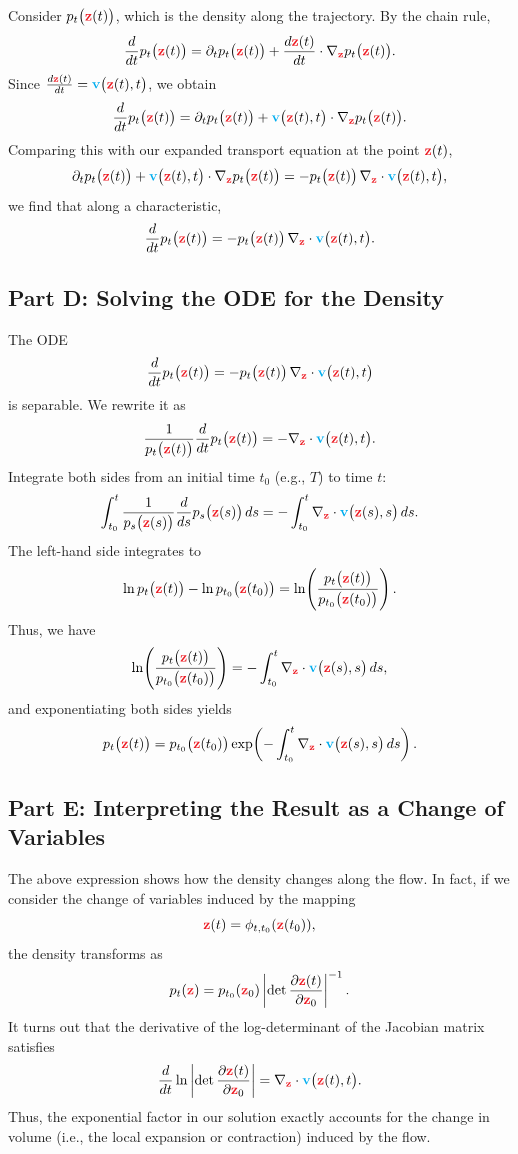 \documentclass[usenames,dvipsnames]{article}
\newcommand{\myvec}[1]{\mathbf{#1}}
\newcommand{\vz}{\myvec{\textcolor{Red}{z}}}
\newcommand{\vv}{\myvec{\textcolor{Cyan}{v}}}
\begin{document}
Consider $p_t\bigl(\vz(t)\bigr)$,
which is the density along the trajectory. By the chain rule,
\[
\frac{d}{dt} p_t\bigl(\vz(t)\bigr) = \partial_t p_t\bigl(\vz(t)\bigr) + \frac{d\vz(t)}{dt} \cdot \nabla_{\vz} p_t\bigl(\vz(t)\bigr).
\]
Since \(\frac{d\vz(t)}{dt} = \vv\bigl(\vz(t),t\bigr)\), we obtain
\[
\frac{d}{dt} p_t\bigl(\vz(t)\bigr) = \partial_t p_t\bigl(\vz(t)\bigr) + \vv\bigl(\vz(t),t\bigr) \cdot \nabla_{\vz} p_t\bigl(\vz(t)\bigr).
\]
Comparing this with our expanded transport equation at the point \(\vz(t)\),
\[
\partial_t p_t\bigl(\vz(t)\bigr) + \vv\bigl(\vz(t),t\bigr) \cdot \nabla_{\vz} p_t\bigl(\vz(t)\bigr) = - p_t\bigl(\vz(t)\bigr) \, \nabla_{\vz} \cdot \vv\bigl(\vz(t),t\bigr),
\]
we find that along a characteristic,
\[
\frac{d}{dt} p_t\bigl(\vz(t)\bigr) = - p_t\bigl(\vz(t)\bigr) \, \nabla_{\vz} \cdot \vv\bigl(\vz(t),t\bigr).
\]

\subsection*{Part D: Solving the ODE for the Density}

The ODE
\[
\frac{d}{dt} p_t\bigl(\vz(t)\bigr) = - p_t\bigl(\vz(t)\bigr) \, \nabla_{\vz} \cdot \vv\bigl(\vz(t),t\bigr)
\]
is separable. We rewrite it as
\[
\frac{1}{p_t\bigl(\vz(t)\bigr)} \frac{d}{dt} p_t\bigl(\vz(t)\bigr) = - \nabla_{\vz} \cdot \vv\bigl(\vz(t),t\bigr).
\]
Integrate both sides from an initial time \(t_0\) (e.g., \(T\)) to time \(t\):
\[
\int_{t_0}^{t} \frac{1}{p_s\bigl(\vz(s)\bigr)} \frac{d}{ds} p_s\bigl(\vz(s)\bigr) \, ds
= - \int_{t_0}^{t} \nabla_{\vz} \cdot \vv\bigl(\vz(s),s\bigr) \, ds.
\]
The left-hand side integrates to
\[
\ln p_t\bigl(\vz(t)\bigr) - \ln p_{t_0}\bigl(\vz(t_0)\bigr) = \ln\!\left( \frac{p_t\bigl(\vz(t)\bigr)}{p_{t_0}\bigl(\vz(t_0)\bigr)} \right).
\]
Thus, we have
\[
\ln\!\left( \frac{p_t\bigl(\vz(t)\bigr)}{p_{t_0}\bigl(\vz(t_0)\bigr)} \right)
= - \int_{t_0}^{t} \nabla_{\vz} \cdot \vv\bigl(\vz(s),s\bigr) \, ds,
\]
and exponentiating both sides yields
\[
p_t\bigl(\vz(t)\bigr) = p_{t_0}\bigl(\vz(t_0)\bigr) \exp\!\left(- \int_{t_0}^{t} \nabla_{\vz} \cdot \vv\bigl(\vz(s),s\bigr) \, ds\right).
\]

\subsection*{Part E: Interpreting the Result as a Change of Variables}

The above expression shows how the density changes along the flow. In fact, if we consider the change of variables induced by the mapping
\[
\vz(t) = \phi_{t,t_0}(\vz(t_0)),
\]
the density transforms as
\[
p_t(\vz) = p_{t_0}(\vz_0) \left|\det \frac{\partial \vz(t)}{\partial \vz_0}\right|^{-1}.
\]
It turns out that the derivative of the log-determinant of the Jacobian matrix satisfies
\[
\frac{d}{dt} \ln \left|\det \frac{\partial \vz(t)}{\partial \vz_0}\right|
= \nabla_{\vz} \cdot \vv\bigl(\vz(t),t\bigr).
\]
Thus, the exponential factor in our solution exactly accounts for the change in volume (i.e., the local expansion or contraction) induced by the flow.
\end{document}
